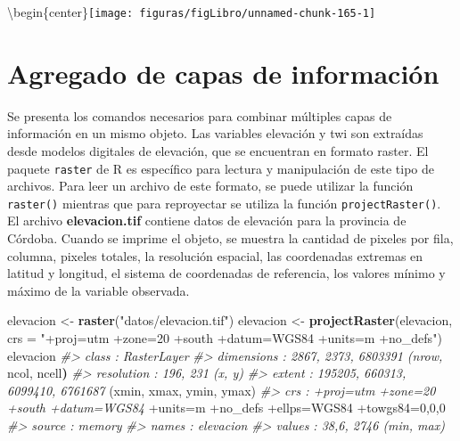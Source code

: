 \documentclass[11pt,b5paper,]{krantz}
\newenvironment{Shaded}{}{}
\newcommand{\CommentTok}[1]{\textcolor[rgb]{0.38,0.63,0.69}{\textit{#1}}}
\newcommand{\DataTypeTok}[1]{\textcolor[rgb]{0.56,0.13,0.00}{#1}}
\newcommand{\DecValTok}[1]{\textcolor[rgb]{0.25,0.63,0.44}{#1}}
\newcommand{\ErrorTok}[1]{\textcolor[rgb]{1.00,0.00,0.00}{\textbf{#1}}}
\newcommand{\KeywordTok}[1]{\textcolor[rgb]{0.00,0.44,0.13}{\textbf{#1}}}
\newcommand{\NormalTok}[1]{#1}
\newcommand{\OperatorTok}[1]{\textcolor[rgb]{0.40,0.40,0.40}{#1}}
\newcommand{\StringTok}[1]{\textcolor[rgb]{0.25,0.44,0.63}{#1}}
\begin{document}
\textbackslash{}begin\{center\}\texttt{[image: figuras/figLibro/unnamed-chunk-165-1]}

\hypertarget{agregado-de-capas-de-informaciuxf3n}{%
\section{Agregado de capas de información}\label{agregado-de-capas-de-informaciuxf3n}}

Se presenta los comandos necesarios para combinar múltiples capas de información en un mismo objeto. Las variables elevación y twi son extraídas desde modelos digitales de elevación, que se encuentran en formato raster. El paquete \texttt{raster} de R es específico para lectura y manipulación de este tipo de archivos. Para leer un archivo de este formato, se puede utilizar la función \texttt{raster()} mientras que para reproyectar se utiliza la función \texttt{projectRaster()}. El archivo \textbf{elevacion.tif} contiene datos de elevación para la provincia de Córdoba. Cuando se imprime el objeto, se muestra la cantidad de pixeles por fila, columna, pixeles totales, la resolución espacial, las coordenadas extremas en latitud y longitud, el sistema de coordenadas de referencia, los valores mínimo y máximo de la variable observada.

\begin{Shaded}
\begin{Highlighting}[]
\NormalTok{elevacion <-}\StringTok{ }\KeywordTok{raster}\NormalTok{(}\StringTok{"datos/elevacion.tif"}\NormalTok{)}
\NormalTok{elevacion <-}
\StringTok{  }\KeywordTok{projectRaster}\NormalTok{(elevacion, }
                \DataTypeTok{crs =} \StringTok{"+proj=utm +zone=20 +south }
\StringTok{                +datum=WGS84 +units=m +no_defs"}\NormalTok{)}
\NormalTok{elevacion}
\CommentTok{#> class : RasterLayer}
\CommentTok{#> dimensions : 2867, 2373, 6803391 (nrow,}
\NormalTok{ncol, ncell}\ErrorTok{)}
\CommentTok{#> resolution : 196, 231 (x, y)}
\CommentTok{#> extent : 195205, 660313, 6099410, 6761687}
\NormalTok{(xmin, xmax, ymin, ymax)}
\CommentTok{#> crs : +proj=utm +zone=20 +south +datum=WGS84}
\OperatorTok{+}\NormalTok{units=m }\OperatorTok{+}\NormalTok{no_defs }\OperatorTok{+}\NormalTok{ellps=WGS84 }\OperatorTok{+}\NormalTok{towgs84=}\DecValTok{0}\NormalTok{,}\DecValTok{0}\NormalTok{,}\DecValTok{0}
\CommentTok{#> source : memory}
\CommentTok{#> names : elevacion}
\CommentTok{#> values : 38,6, 2746 (min, max)}
\end{Highlighting}
\end{Shaded}
\end{document}
